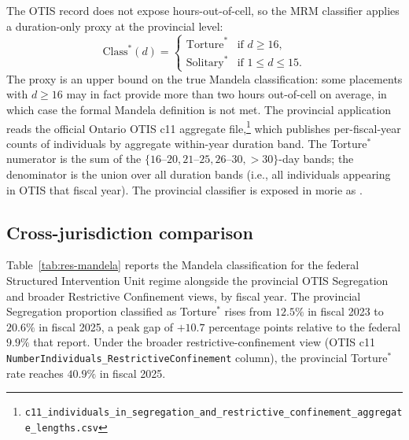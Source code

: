 \documentclass[article,shortnames,nojss]{jss}
\newcommand{\OTIS}{\textsf{OTIS}}
\begin{document}
The \OTIS{} record does not expose hours-out-of-cell, so the MRM
classifier applies a duration-only proxy at the provincial level:
\begin{equation}
\label{eq:provincial-mandela}
  \mathrm{Class}^{\ast}(d) = \begin{cases}
    \mathrm{Torture}^{\ast}  & \text{if } d \ge 16, \\
    \mathrm{Solitary}^{\ast} & \text{if } 1 \le d \le 15.
  \end{cases}
\end{equation}
The proxy is an upper bound on the true Mandela classification: some
placements with $d \ge 16$ may in fact provide more than two hours
out-of-cell on average, in which case the formal Mandela definition
is not met. The provincial application reads the official Ontario
\OTIS{} c11 aggregate file,\footnote{\texttt{c11\_individuals\_in\_segregation\_and\_restrictive\_confinement\_aggregate\_lengths.csv}}
which publishes per-fiscal-year counts of individuals by aggregate
within-year duration band. The Torture$^{\ast}$ numerator is the
sum of the $\{16\text{--}20, 21\text{--}25, 26\text{--}30,
>30\}$-day bands; the denominator is the union over all duration
bands (i.e., all individuals appearing in \OTIS{} that fiscal year).
The provincial classifier is exposed in morie as
.

\subsection{Cross-jurisdiction comparison}
\label{sec:mandela-cross-jurisdiction}

Table~\ref{tab:res-mandela} reports the Mandela classification for the
federal Structured Intervention Unit regime \citep{SprottDoob2023}
alongside the provincial \OTIS{} Segregation and broader Restrictive
Confinement views, by fiscal year. The provincial Segregation
proportion classified as Torture$^{\ast}$ rises from $12.5\%$ in
fiscal 2023 to $20.6\%$ in fiscal 2025, a peak gap of $+10.7$
percentage points relative to the federal $9.9\%$ that
\citet{SprottDoob2023} report. Under the broader
restrictive-confinement view (\OTIS{} c11
\texttt{NumberIndividuals\_RestrictiveConfinement} column), the
provincial Torture$^{\ast}$ rate reaches $40.9\%$ in fiscal 2025.
\end{document}
